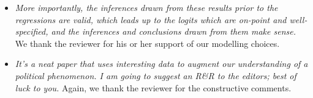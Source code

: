 \documentclass[12pt]{article}
\begin{document}
\begin{itemize}
\item \emph{More importantly, the inferences drawn from these results prior 
to the regressions are valid, which leads up to the logits which are on-point 
and well-specified, and the inferences and conclusions drawn from them make sense.} We thank the reviewer
for his or her support of our modelling choices.


\item \emph{It's a neat paper that uses interesting data to augment our understanding 
of a political phenomenon. I am going to suggest an R&R to the editors; best of luck to you.}
Again, we thank the reviewer for the constructive comments. 

\end{itemize}
\end{document}
